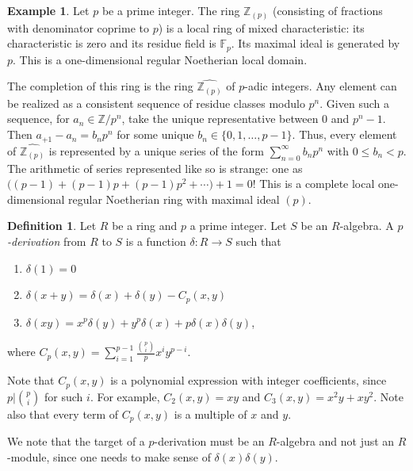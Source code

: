 \documentclass{amsart}[12pt]
\newcommand{\F}{\mathbb{F}}
\newcommand{\Z}{\mathbb{Z}}
\numberwithin{equation}{section}
\theoremstyle{plain} %
\theoremstyle{definition}
\newtheorem{defn}[equation]{Definition}
\newtheorem{ex}[equation]{Example}
\theoremstyle{remark}
\begin{document}
\begin{ex} Let $p$ be a prime integer. The ring $\Z_{(p)}$ (consisting of fractions with denominator coprime to $p$) is a local ring of mixed characteristic: its characteristic is zero and its residue field is $\F_p$. Its maximal ideal is generated by $p$. This is a one-dimensional regular Noetherian local domain.

The completion of this ring is the ring $\widehat{\Z_{(p)}}$ of $p$-adic integers. Any element can be realized as a consistent sequence of residue classes modulo $p^n$. Given such a sequence, for $a_n\in \Z/p^n$, take the unique representative between $0$ and $p^n-1$. Then $a_{+1} - a_{n} = b_n p^{n}$ for some unique $b_n\in \{0,1,\dots,p-1\}$. Thus, every element of $\widehat{\Z_{(p)}}$ is represented by a unique series of the form $\sum_{n=0}^\infty b_n p^{n}$ with $0\leq b_n <p$. The arithmetic of series represented like so is strange: one as $\big((p-1) + (p-1)p + (p-1) p^2 + \cdots\big) + 1 = 0$!
This is a complete local one-dimensional regular Noetherian ring with maximal ideal $(p)$.
\end{ex}

\begin{defn} Let $R$ be a ring and $p$ a prime integer. Let $S$ be an $R$-algebra. A \emph{$p$-derivation} from $R$ to $S$ is a function $\delta:R\to S$ such that
\begin{enumerate}
\item $\delta(1)=0$
\item $\delta(x+y) = \delta(x) + \delta(y) - C_p(x,y)$
\item $\delta(xy) = x^p \delta(y) + y^p\delta(x) + p \delta(x)\delta(y)$,
\end{enumerate}
where $C_p(x,y) = \sum_{i=1}^{p-1}\frac{ \binom{p}{i}}{p} x^i y^{p-i}$.
\end{defn}

Note that $C_p(x,y)$ is a polynomial expression with integer coefficients, since $p |  \binom{p}{i}$ for such $i$.
 For example, $C_2(x,y) = xy$ and $C_3(x,y) = x^2 y + xy^2$. Note also that every term of $C_p(x,y)$ is a multiple of $x$ and $y$.
 
We note that the target of a $p$-derivation must be an $R$-algebra and not just an $R$-module, since one needs to make sense of $\delta(x)\delta(y)$.
\end{document}
